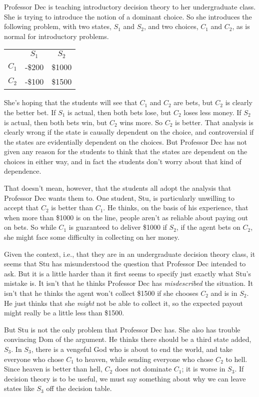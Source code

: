 Professor Dec is teaching introductory decision theory to her undergraduate class. She is trying to introduce the notion of a dominant choice. So she introduces the following problem, with two states, \(S_1\) and \(S_2\), and two choices, \(C_1\) and \(C_2\), as is normal for introductory problems.

\begin{center}
\begin{tabular}{r c c}
 & \(S_1\) & \(S_2\) \\
\(C_1\) & -\$200 & \$1000 \\
\(C_2\) & -\$100 & \$1500 
\end{tabular}
\end{center}

\noindent She's hoping that the students will see that \(C_1\) and \(C_2\) are bets, but \(C_2\) is clearly the better bet. If \(S_1\) is actual, then both bets lose, but \(C_2\) loses less money. If \(S_2\) is actual, then both bets win, but \(C_2\) wins more. So \(C_2\) is better. That analysis is clearly wrong if the state is causally dependent on the choice, and controversial if the states are evidentially dependent on the choices. But Professor Dec has not given any reason for the students to think that the states are dependent on the choices in either way, and in fact the students don't worry about that kind of dependence.

That doesn't mean, however, that the students all adopt the analysis that Professor Dec wants them to. One student, Stu, is particularly unwilling to accept that \(C_2\) is better than \(C_1\). He thinks, on the basis of his experience, that when more than \$1000 is on the line, people aren't as reliable about paying out on bets. So while \(C_1\) is guaranteed to deliver \$1000 if \(S_2\), if the agent bets on \(C_2\), she might face some difficulty in collecting on her money.

Given the context, i.e., that they are in an undergraduate decision theory class, it seems that Stu has misunderstood the question that Professor Dec intended to ask. But it is a little harder than it first seems to specify just exactly what Stu's mistake is. It isn't that he thinks Professor Dec has \textit{misdescribed} the situation. It isn't that he thinks the agent won't collect \$1500 if she chooses \(C_2\) and is in \(S_2\). He just thinks that she \textit{might} not be able to collect it, so the expected payout might really be a little less than \$1500.

But Stu is not the only problem that Professor Dec has. She also has trouble convincing Dom of the argument. He thinks there should be a third state added, $S_3$. In $S_3$, there is a vengeful God who is about to end the world, and take everyone who chose $C_1$ to heaven, while sending everyone who chose $C_2$ to hell. Since heaven is better than hell, $C_2$ does not dominate $C_1$; it is worse in $S_3$. If decision theory is to be useful, we must say something about why we can leave states like $S_3$ off the decision table.

